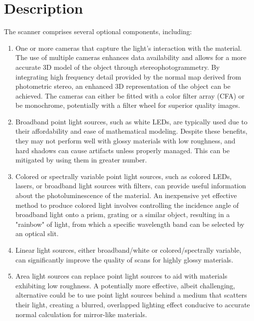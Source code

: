 \documentclass[11pt, twoside, listof=totocnumbered, bibliography=totocnumbered]{scrartcl}
\begin{document}
\section{Description}
The scanner comprises several optional components, including:
\begin{enumerate}
	\item One or more cameras that capture the light's interaction with the material. The use of multiple cameras enhances data availability and allows for a more accurate 3D model of the object through stereophotogrammetry. By integrating high frequency detail provided by the normal map derived from photometric stereo, an enhanced 3D representation of the object can be achieved. The cameras can either be fitted with a color filter array (CFA) or be monochrome, potentially with a filter wheel for superior quality images.
	
	\item Broadband point light sources, such as white LEDs, are typically used due to their affordability and ease of mathematical modeling. Despite these benefits, they may not perform well with glossy materials with low roughness, and hard shadows can cause artifacts unless properly managed. This can be mitigated by using them in greater number.
	
	\item Colored or spectrally variable point light sources, such as colored LEDs, lasers, or broadband light sources with filters, can provide useful information about the photoluminescence of the material. An inexpensive yet effective method to produce colored light involves controlling the incidence angle of broadband light onto a prism, grating or a similar object, resulting in a "rainbow" of light, from which a specific wavelength band can be selected by an optical slit.

	\item Linear light sources, either broadband/white or colored/spectrally variable, can significantly improve the quality of scans for highly glossy materials. \cite{LINEAR_LIGHT}
	
	\item Area light sources can replace point light sources to aid with materials exhibiting low roughness. A potentially more effective, albeit challenging, alternative could be to use point light sources behind a medium that scatters their light, creating a blurred, overlapped lighting effect conducive to accurate normal calculation for mirror-like materials. \cite{PS_AreaLights}
	

\end{enumerate}
\end{document}
